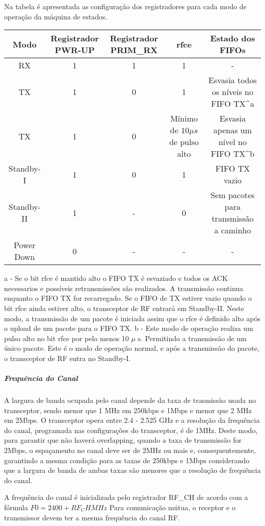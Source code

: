 Na tabela \cite{tab_com_pc1_01} é apresentada as configuração dos registradores para cada modo de operação da máquina de estados.
\begin{table}
\begin{tabular}{| c | c | c | c | c |}\hline
Modo & Registrador PWR-UP & Registrador PRIM_RX & rfce & Estado dos FIFOs \\ \hline
RX & 1 & 1 & 1 & - \\ \hline
TX & 1 & 0 & 1 & Esvasia todos os níveis no FIFO TX^a \\ \hline
TX & 1 & 0 & Mínimo de $10\mu s$ de pulso alto & Esvasia apenas um nível no FIFO TX^b \\ \hline
Standby-I & 1 & 0 & 1 & FIFO TX vazio \\ \hline
Standby-II & 1 & - & 0 & Sem pacotes para transmissão a caminho \\ \hline
Power Down & 0 & - & - & - \\ \hline
\end{tabular}
a - Se o bit rfce é mantido alto o FIFO TX é esvaziado e todos os ACK necessarios e possíveis retransmissões são realizados. A transmissão continua enquanto o FIFO TX for recarregado. Se o FIFO de TX estiver vazio quando o bit rfce ainda estiver alto, o transceptor de RF entrará em Standby-II. Neste modo, a transmissão de um pacote é iniciada assim que o rfce é definido alto após o upload de um pacote para o FIFO TX.
b - Este modo de operação realiza um pulso alto no bit rfce por pelo menos 10 $\mu$ s. Permitindo a transmissão de um único pacote. Este é o modo de operação normal, e após a transmissão do pacote, o transceptor de RF entra no Standby-I.
\end{table}

\subparagraph{Frequência do Canal}
A largura de banda ocupada pelo canal depende da taxa de trasmissão usada no transceptor, sendo menor que 1 MHz em 250kbps e 1Mbps e menor que 2 MHz em 2Mbps. O transceptor opera entre 2.4 - 2.525 GHz e a resolução da frequência do canal, programada nas configurações do transceptor, é de 1MHz. Deste modo, para garantir que não haverá overlapping, quando a taxa de transmissão for 2Mbps, o espaçamento no canal deve ser de 2MHz ou mais e, consequentemente, garantindo a mesma condição para as taxas de 250kbps e 1Mbps considerando que a largura de banda de ambas taxas são menores que a resolução de frequência do canal. 

A frequência do canal é inicializada pelo registrador RF_CH de acordo com a fórmula 
$F0= 2400 + RF_CH MHz$
Para comunicação mútua, o receptor e o transmissor devem ter a mesma frequência do canal RF.

